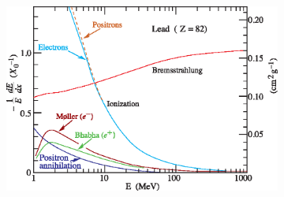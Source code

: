 \begin{figure}[htbp!]
  \centering
  \begin{subfigure}[t]{0.56\textwidth}
    \includegraphics[width=1\linewidth]{chap2/fig/elossfrac_06.eps}
    \caption{} \label{fig:ElossEM}
  \end{subfigure}
  \hfill
  \begin{subfigure}[t]{0.43\textwidth}

\end{subfigure}
\end{figure}
